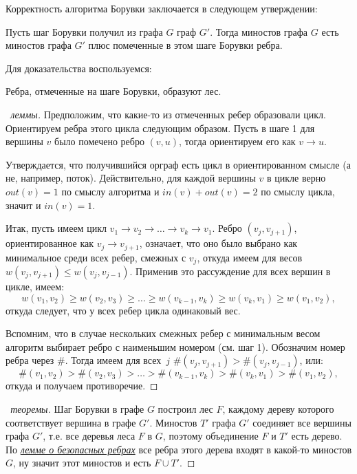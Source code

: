 Корректность алгоритма Борувки заключается в следующем утверждении:

\begin{theorem*}
	Пусть шаг Борувки получил из графа $G$ граф $G'$. Тогда миностов графа $G$ есть миностов графа $G'$ плюс помеченные в этом шаге Борувки ребра.
\end{theorem*}
Для доказательства воспользуемся:
\begin{lemma*}
	Ребра, отмеченные на шаге Борувки, образуют лес.
\end{lemma*}
\begin{proof}[\achtung ~леммы]

Предположим, что какие-то из отмеченных ребер образовали цикл. Ориентируем ребра этого цикла следующим образом. Пусть в шаге 1 для вершины $v$ было помечено ребро $(v, u)$, тогда ориентируем его как $v\rightarrow u$.

Утверждается, что получившийся орграф есть цикл в ориентированном смысле (а не, например, поток). Действительно, для каждой вершины $v$ в цикле верно $out(v) = 1$ по смыслу алгоритма и $in(v) + out(v) = 2$ по смыслу цикла, значит и $in(v) = 1$.

Итак, пусть имеем цикл $v_1 \rightarrow v_2 \rightarrow \ldots \rightarrow v_k \rightarrow v_1$. Ребро $(v_j, v_{j+1})$, ориентированное как $v_j \rightarrow v_{j+1}$, означает, что оно было выбрано как минимальное среди всех ребер, смежных с $v_j$, откуда имеем для весов $w(v_j, v_{j+1}) \leq w(v_j, v_{j-1})$. Применив это рассуждение для всех вершин в цикле, имеем: $$w(v_1, v_2) \geq w(v_2, v_3) \geq \ldots \geq w(v_{k-1}, v_k) \geq w(v_k, v_1) \geq w(v_1, v_2),$$
откуда следует, что у всех ребер цикла одинаковый вес.

Вспомним, что в случае нескольких смежных ребер с минимальным весом алгоритм выбирает ребро с наименьшим номером (см. шаг 1). Обозначим номер ребра через $\#$. Тогда имеем для всех~$j$ $\#(v_j, v_{j+1}) > \#(v_j, v_{j-1})$, или:
$$\#(v_1, v_2) > \#(v_2, v_3) > \ldots > \#(v_{k-1}, v_k) > \#(v_k, v_1) > \#(v_1, v_2),$$
откуда и получаем противоречие.
\end{proof}

\begin{proof}[\achtung ~теоремы]
Шаг Борувки в графе $G$ построил лес $F$, каждому дереву которого соответствует вершина в графе $G'$. Миностов $T'$ графа $G'$ соединяет все вершины графа $G'$, т.е. все деревья леса $F$ в $G$, поэтому объединение $F$ и $T'$ есть дерево. По \hyperlink{baselemma}{\textit{лемме о безопасных ребрах}} все ребра этого дерева входят в какой-то миностов $G$, ну значит этот миностов и есть $F \cup T'$.
\end{proof}

